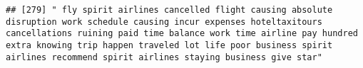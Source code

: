 \documentclass[
]{article}
\begin{document}
\begin{verbatim}
## [279] " fly spirit airlines cancelled flight causing absolute disruption work schedule causing incur expenses hoteltaxitours cancellations ruining paid time balance work time airline pay hundred extra knowing trip happen traveled lot life poor business spirit airlines recommend spirit airlines staying business give star"                                                                                                                                                                                                                                                                                                                                                                                                                                                                                                                                                                                                                                                                                                                                                                                                                                                                                                                                                                                                                                                                                                                                                                                                                                                                                                                                                                                                                                                                    

\end{verbatim}
\end{document}
